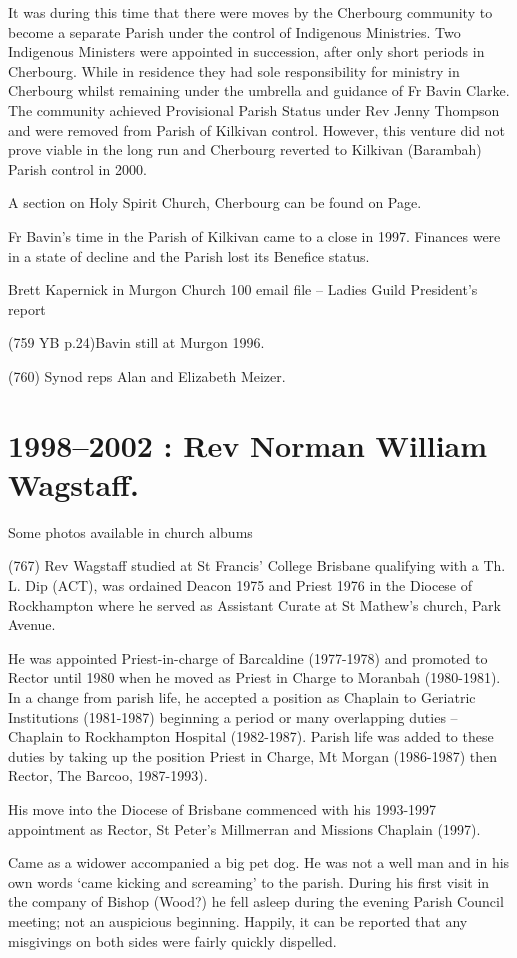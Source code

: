 It was during this time that there were moves by the Cherbourg community
to become a separate Parish under the control of Indigenous Ministries.
Two Indigenous Ministers were appointed in succession, after only short
periods in Cherbourg. While in residence they had sole responsibility
for ministry in Cherbourg whilst remaining under the umbrella and
guidance of Fr Bavin Clarke. The community achieved Provisional Parish
Status under Rev Jenny Thompson and were removed from Parish of Kilkivan
control. However, this venture did not prove viable in the long run and
Cherbourg reverted to Kilkivan (Barambah) Parish control in 2000.

A section on Holy Spirit Church, Cherbourg can be found on Page.

Fr Bavin's time in the Parish of Kilkivan came to a close in 1997.
Finances were in a state of decline and the Parish lost its Benefice
status.

Brett Kapernick in Murgon Church 100 email file -- Ladies Guild
President's report

(759 YB p.24)Bavin still at Murgon 1996.

(760) Synod reps Alan and Elizabeth Meizer.

\chapter{1998--2002 : Rev Norman William
Wagstaff.}

Some photos available in church albums

(767) Rev Wagstaff studied at St Francis' College Brisbane qualifying
with a Th. L. Dip (ACT), was ordained Deacon 1975 and Priest 1976 in the
Diocese of Rockhampton where he served as Assistant Curate at St
Mathew's church, Park Avenue.

He was appointed Priest-in-charge of Barcaldine (1977-1978) and promoted
to Rector until 1980 when he moved as Priest in Charge to Moranbah
(1980-1981). In a change from parish life, he accepted a position as
Chaplain to Geriatric Institutions (1981-1987) beginning a period or
many overlapping duties -- Chaplain to Rockhampton Hospital (1982-1987).
Parish life was added to these duties by taking up the position Priest
in Charge, Mt Morgan (1986-1987) then Rector, The Barcoo, 1987-1993).

His move into the Diocese of Brisbane commenced with his 1993-1997
appointment as Rector, St Peter's Millmerran and Missions Chaplain
(1997).

Came as a widower accompanied a big pet dog. He was not a well man and
in his own words `came kicking and screaming' to the parish. During his
first visit in the company of Bishop (Wood?) he fell asleep during the
evening Parish Council meeting; not an auspicious beginning. Happily, it
can be reported that any misgivings on both sides were fairly quickly
dispelled.

